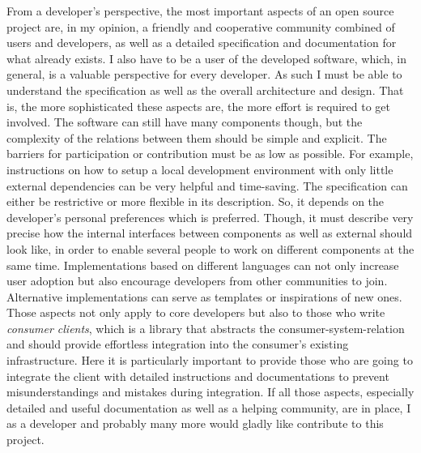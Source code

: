 \documentclass[12pt,english,a4paper,titlepage,cleardoublepage=empty,dottedtoc]{report}
\begin{document}
From a developer's perspective, the most important aspects of an open
source project are, in my opinion, a friendly and cooperative community
combined of users and developers, as well as a detailed specification
and documentation for what already exists. I also have to be a user of
the developed software, which, in general, is a valuable perspective for
every developer. As such I must be able to understand the specification
as well as the overall architecture and design. That is, the more
sophisticated these aspects are, the more effort is required to get
involved. The software can still have many components though, but the
complexity of the relations between them should be simple and explicit.
The barriers for participation or contribution must be as low as
possible. For example, instructions on how to setup a local development
environment with only little external dependencies can be very helpful
and time-saving. The specification can either be restrictive or more
flexible in its description. So, it depends on the developer's personal
preferences which is preferred. Though, it must describe very precise
how the internal interfaces between components as well as external
should look like, in order to enable several people to work on different
components at the same time. Implementations based on different
languages can not only increase user adoption but also encourage
developers from other communities to join. Alternative implementations
can serve as templates or inspirations of new ones. Those aspects not
only apply to core developers but also to those who write \emph{consumer
clients}, which is a library that abstracts the consumer-system-relation
and should provide effortless integration into the consumer's existing
infrastructure. Here it is particularly important to provide those who
are going to integrate the client with detailed instructions and
documentations to prevent misunderstandings and mistakes during
integration. If all those aspects, especially detailed and useful
documentation as well as a helping community, are in place, I as a
developer and probably many more would gladly like contribute to this
project.
\end{document}

